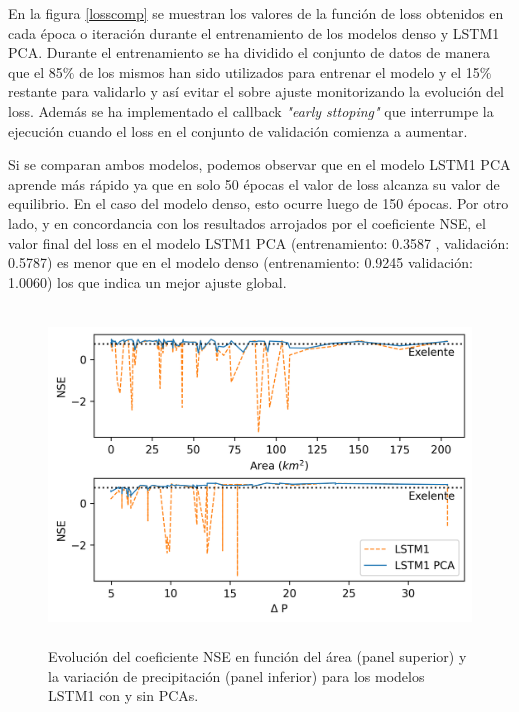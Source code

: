 En la figura \ref{losscomp} se muestran los valores de la función de loss obtenidos en cada época o iteración durante el entrenamiento
de los modelos denso y LSTM1 PCA.  Durante el entrenamiento se ha dividido el conjunto de datos de manera que el 
85$\%$ de los mismos han sido utilizados para entrenar el modelo y el 15$\%$ restante para validarlo y así evitar el sobre ajuste
monitorizando la evolución del loss. Además se ha implementado el callback \textit{"early sttoping"} que 
interrumpe la ejecución cuando el loss en el conjunto de validación comienza a aumentar.

Si se comparan ambos modelos, podemos observar que
en el modelo LSTM1 PCA aprende más rápido ya que en solo 50 épocas el valor de loss alcanza su valor de equilibrio.
En el caso del modelo denso, esto ocurre luego de 150 épocas. Por otro lado, y en concordancia con los resultados
arrojados por el coeficiente NSE, el valor final del loss en el modelo LSTM1 PCA (entrenamiento: 0.3587 , validación: 0.5787)
es menor que en el modelo denso (entrenamiento: 0.9245 validación: 1.0060) los que indica un mejor ajuste global. 


  \begin{figure}[h!]
    \begin{center}
      \includegraphics[height=3.5in]{Figures/NSE/comp_NSE_consinPCA.png}
      \caption{ Evolución del coeficiente NSE en función del área (panel superior) y la variación de precipitación 
      (panel inferior) para los modelos LSTM1 con y sin PCAs.}
      \label{NSEs_Area_prec}
    \end{center}
  \end{figure}


